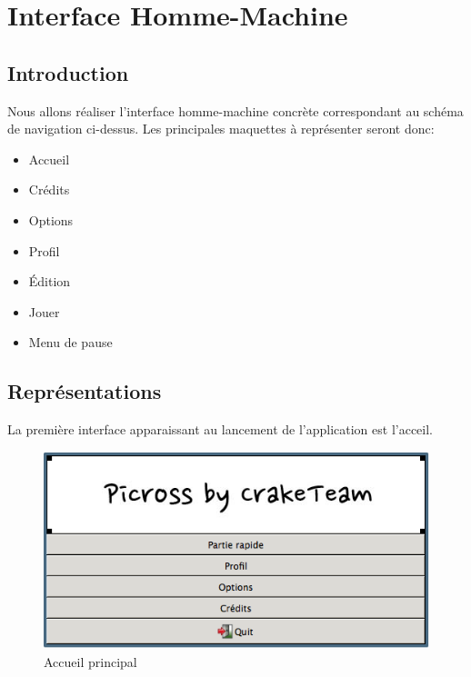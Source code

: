 \documentclass[11pt]{article}
\begin{document}

\newpage

\section{Interface Homme-Machine}
	\subsection{Introduction}
	Nous allons réaliser l'interface homme-machine concrète correspondant au schéma de navigation ci-dessus. Les principales maquettes à représenter seront donc:
	\begin{itemize}
		\item Accueil
		\item Crédits
		\item Options
		\item Profil
		\item Édition
		\item Jouer
		\item Menu de pause
	\end{itemize}
	
	\subsection{Représentations}
	La première interface apparaissant au lancement de l'application est l'acceil.
	
		\begin{figure}[!ht]
			\centering
			\includegraphics[]{./IHM/accueil.png}
			\caption{Accueil principal}
		\end{figure}
		
	\FloatBarrier
		
\end{document}
